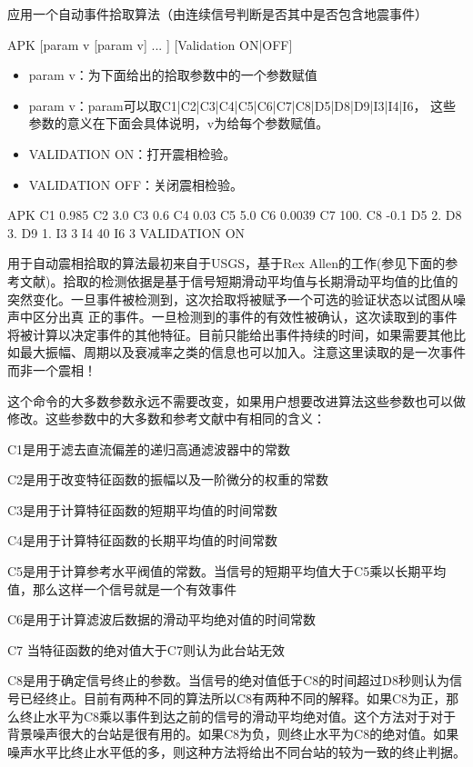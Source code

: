 \label{cmd:apk}

应用一个自动事件拾取算法（由连续信号判断是否其中是否包含地震事件）

APK [param v [param v] ... ] [Validation ON|OFF]

\begin{itemize}
\item param v：为下面给出的拾取参数中的一个参数赋值
\item param v：param可以取C1|C2|C3|C4|C5|C6|C7|C8|D5|D8|D9|I3|I4|I6，
这些参数的意义在下面会具体说明，v为给每个参数赋值。
\item VALIDATION ON：打开震相检验。
\item VALIDATION OFF：关闭震相检验。
\end{itemize}

APK C1 0.985 C2 3.0 C3 0.6 C4 0.03 C5 5.0 C6 0.0039 C7 100. C8 -0.1 D5 		2. D8 3. D9 1. I3 3 I4 40 I6 3 VALIDATION ON

用于自动震相拾取的算法最初来自于USGS，基于Rex Allen的工作(参见下面的参考文献)。拾取的检测依据是基于信号短期滑动平均值与长期滑动平均值的比值的突然变化。一旦事件被检测到，这次拾取将被赋予一个可选的验证状态以试图从噪声中区分出真	正的事件。一旦检测到的事件的有效性被确认，这次读取到的事件将被计算以决定事件的其他特征。目前只能给出事件持续的时间，如果需要其他比如最大振幅、周期以及衰减率之类的信息也可以加入。注意这里读取的是一次事件而非一个震相！

这个命令的大多数参数永远不需要改变，如果用户想要改进算法这些参数也可以做修改。这些参数中的大多数和参考文献中有相同的含义：

C1是用于滤去直流偏差的递归高通滤波器中的常数

C2是用于改变特征函数的振幅以及一阶微分的权重的常数

C3是用于计算特征函数的短期平均值的时间常数

C4是用于计算特征函数的长期平均值的时间常数

C5是用于计算参考水平阀值的常数。当信号的短期平均值大于C5乘以长期平均值，那么这样一个信号就是一个有效事件

C6是用于计算滤波后数据的滑动平均绝对值的时间常数

C7 当特征函数的绝对值大于C7则认为此台站无效

C8是用于确定信号终止的参数。当信号的绝对值低于C8的时间超过D8秒则认为信号已经终止。目前有两种不同的算法所以C8有两种不同的解释。如果C8为正，那么终止水平为C8乘以事件到达之前的信号的滑动平均绝对值。这个方法对于对于背景噪声很大的台站是很有用的。如果C8为负，则终止水平为C8的绝对值。如果噪声水平比终止水平低的多，则这种方法将给出不同台站的较为一致的终止判据。

